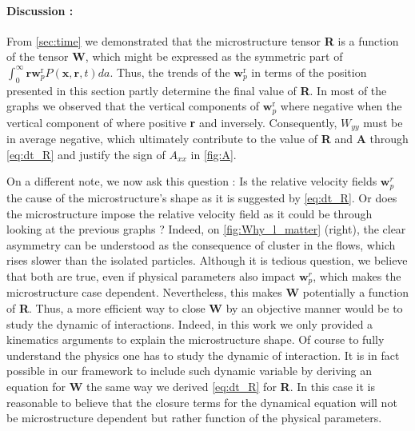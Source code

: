 \paragraph*{Discussion :}
From \ref{sec:time} we demonstrated that the microstructure tensor \textbf{R} is a function of the tensor $\textbf{W}$, which might be expressed as the symmetric part of $\int_0^\infty \textbf{r} \textbf{w}_p^\text{r} P(\textbf{x},\textbf{r},t) da$. 
Thus, the trends of the $\textbf{w}_p^\text{r}$ in terms of the position presented in this section partly determine the final value of \textbf{R}. 
In most of the graphs we observed that the vertical components of $\textbf{w}_p^\text{r}$ where negative when the vertical component of where positive \textbf{r} and inversely. 
Consequently, $W_{yy}$ must be in average negative, which ultimately contribute to the value of \textbf{R} and \textbf{A} through \ref{eq:dt_R} and justify the sign of $A_{xx}$ in \ref{fig:A}. 

On a different note, we now ask this question : 
Is the relative velocity fields $\textbf{w}_p^r$ the cause of the microstructure's shape as it is suggested by \ref{eq:dt_R}. 
Or does the microstructure impose the relative velocity field as it could be through looking at the previous graphs ?
Indeed, on \ref{fig:Why_l_matter} (right), the clear asymmetry can be understood as the consequence of cluster in the flows, which rises slower than the isolated particles. 
Although it is tedious question, we believe that both are true, even if physical parameters also impact $\textbf{w}_p^r$, which makes the microstructure case dependent.  
Nevertheless, this makes \textbf{W} potentially a function of \textbf{R}.
Thus, a more efficient way to close \textbf{W} by an objective manner would be to study the dynamic of interactions. 
Indeed, in this work we only provided a kinematics arguments to explain the microstructure shape. 
Of course to fully understand the physics one has to study the dynamic of interaction. 
It is in fact possible in our framework to include such dynamic variable by deriving an equation for \textbf{W} the same way we derived \ref{eq:dt_R} for \textbf{R}.
In this case it is reasonable to believe that the closure terms for the dynamical equation will not be microstructure dependent but rather function of the physical parameters. 